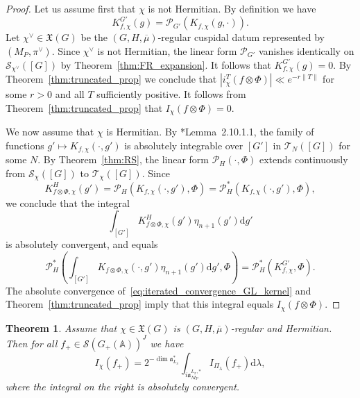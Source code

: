 \documentclass[letterpaper,11pt]{amsart}
\newcommand{\bA}{\mathbb{A}}
\newcommand{\cP}{\mathcal{P}}
\newcommand{\cS}{\mathcal{S}}
\newcommand{\cT}{\mathcal{T}}
\newcommand{\rd}{\mathrm{d}}
\newcommand{\<}{\negthickspace}
\providecommand{\aabs}[1]{\lVert#1\rVert}
\newcommand{\valP}[1]{\left|#1\right|}
\theoremstyle{definition}
\theoremstyle{plain}
\newtheorem{theorem}[definition]{Theorem}
\theoremstyle{remark}
\numberwithin{equation}{section}
\begin{document}
\begin{proof}
Let us assume first that $\chi$ is not Hermitian. By definition we have
    \[
    K_{f, \chi}^{G'}(g) =
    \cP_{G'}\left( K_{f, \chi}(g, \cdot)\right).
    \]
Let $\chi^\vee \in \mathfrak{X}(G)$ be the $(G,H,\overline{\mu})$-regular cuspidal datum
represented by $(M_P,\pi^\vee)$. Since $\chi^\vee$ is not Hermitian, the linear
form $\cP_{G'}$ vanishes identically on $\cS_{\chi^\vee}([G])$ by Theorem~\ref{thm:FR_expansion}. It follows that $K_{f, \chi}^{G'}(g) = 0$. By
Theorem~\ref{thm:truncated_prop} we conclude that $\valP{i_{\chi}^T(f \otimes \Phi)} \ll e^{-r \aabs{T}}$ for some $r>0$ and all $T$ sufficiently positive. It follows from Theorem~\ref{thm:truncated_prop} that $I_{\chi}(f \otimes \Phi) = 0$.


We now assume that $\chi$ is Hermitian. By \cite{BPCZ}*{Lemma~2.10.1.1}, the family of functions $g' \mapsto K_{f,
\chi}(\cdot, g')$ is absolutely integrable over $[G']$ in
$\mathcal{T}_N([G])$ for some $N$. By Theorem~\ref{thm:RS}, the linear form
$\cP_{H}(\cdot, \Phi)$ extends continuously from $\cS_{\chi}([G])$ to
$\cT_{\chi}([G])$. Since
    \[
    K_{f \otimes \Phi, \chi}^H(g') =
    \cP_{H}\left( K_{f, \chi}(\cdot, g'), \Phi \right) =
    \cP_{H}^*\left( K_{f, \chi}(\cdot, g'), \Phi \right),
    \]
we conclude that the integral
    \begin{equation}    \label{eq:iterated_convergence_GL_kernel}
    \int_{[G']} K_{f \otimes \Phi, \chi}^H(g') \eta_{n+1}(g')\rd g'
    \end{equation}
is absolutely convergent, and equals
    \[
    \cP_{H}^* \left(\int_{[G']} K_{f \otimes \Phi, \chi}(\cdot, g')
    \eta_{n+1}(g') \rd g', \Phi \right)
    = \cP_{H}^*\left(K_{f, \chi}^{G'}, \Phi \right).
    \]
The absolute convergence of~\eqref{eq:iterated_convergence_GL_kernel}
and Theorem~\ref{thm:truncated_prop} imply that this integral
equals $I_{\chi}(f \otimes \Phi)$.
\end{proof}




\begin{theorem}
\label{thm:Ichi_spectral} Assume that $\chi \in \mathfrak{X}(G)$ is
$(G,H,\overline{\mu})$-regular and Hermitian. Then for all $f_+ \in \cS(G_+(\bA))^J$ we have
    \begin{equation}
    \label{eq:I_pi_spectral}
    I_\chi(f_+)
    =2^{-\dim \mathfrak{a}_{L_\pi}^*}
    \int_{i \mathfrak{a}_{M_P}^{L_\pi, *}} I_{\Pi_\lambda}(f_+)
    \rd \lambda,
    \end{equation}
where the integral on the right is absolutely convergent.
\end{theorem}
\end{document}
